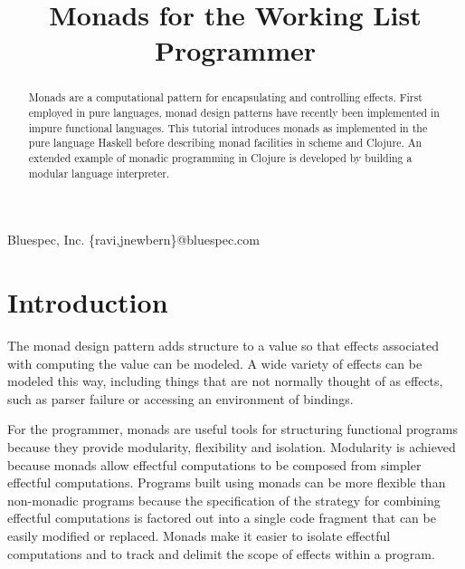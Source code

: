 \documentclass[natbib,10pt]{sigplanconf}
\begin{document}
\copyrightdata{[to be supplied]}
\toappear{}


\title{Monads for the Working List Programmer}

           {Bluespec, Inc.}
           {\{ravi,jnewbern\}@bluespec.com}

\maketitle

\begin{abstract}

Monads are a computational pattern for encapsulating and controlling
effects.  First employed in pure languages, monad design patterns have
recently been implemented in impure functional languages.  This
tutorial introduces monads as implemented in the pure language Haskell
before describing monad facilities in scheme and Clojure.  An extended
example of monadic programming in Clojure is developed by building a
modular language interpreter.

\end{abstract}




\section{Introduction}

The monad design pattern adds structure to a value so that effects
associated with computing the value can be modeled.  A wide variety of
effects can be modeled this way, including things that are not
normally thought of as effects, such as parser failure or accessing an
environment of bindings.

For the programmer, monads are useful tools for structuring functional
programs because they provide modularity, flexibility and isolation.
Modularity is achieved because monads allow effectful computations to
be composed from simpler effectful computations.  Programs built using
monads can be more flexible than non-monadic programs because the
specification of the strategy for combining effectful computations is
factored out into a single code fragment that can be easily modified
or replaced.  Monads make it easier to isolate effectful computations
and to track and delimit the scope of effects within a program.
\end{document}
